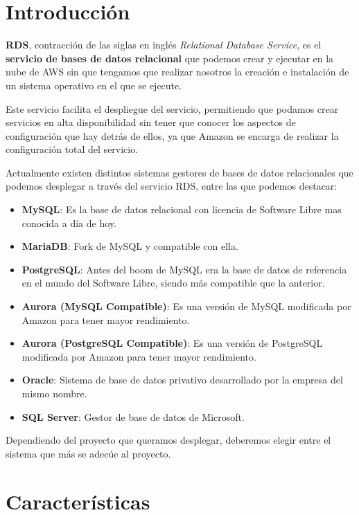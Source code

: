 \chapter{Introducción}

\textbf{RDS}, contracción de las siglas en inglés \textit{Relational Database Service}, es el \textbf{servicio de bases de datos relacional} que podemos crear y ejecutar en la nube de AWS sin que tengamos que realizar nosotros la creación e instalación de un sistema operativo en el que se ejecute.

Este servicio facilita el despliegue del servicio, permitiendo que podamos crear servicios en alta disponibilidad sin tener que conocer los aspectos de configuración que hay detrás de ellos, ya que Amazon se encarga de realizar la configuración total del servicio.

Actualmente existen distintos sistemas gestores de bases de datos relacionales que podemos desplegar a través del servicio RDS, entre las que podemos destacar:

\begin{itemize}
	\item \textbf{MySQL}: Es la base de datos relacional con licencia de Software Libre mas conocida a día de hoy.
	\item \textbf{MariaDB}: Fork de MySQL y compatible con ella.
	\item \textbf{PostgreSQL}: Antes del boom de MySQL era la base de datos de referencia en el mundo del Software Libre, siendo más compatible que la anterior.
	\item \textbf{Aurora (MySQL Compatible)}: Es una versión de MySQL modificada por Amazon para tener mayor rendimiento.
	\item \textbf{Aurora (PostgreSQL Compatible)}: Es una versión de PostgreSQL modificada por Amazon para tener mayor rendimiento.
	\item \textbf{Oracle}: Sistema de base de datos privativo desarrollado por la empresa del mismo nombre.
	\item \textbf{SQL Server}: Gestor de base de datos de Microsoft.
\end{itemize}

Dependiendo del proyecto que queramos desplegar, deberemos elegir entre el sistema que más se adecúe al proyecto.

\chapter{Características}

